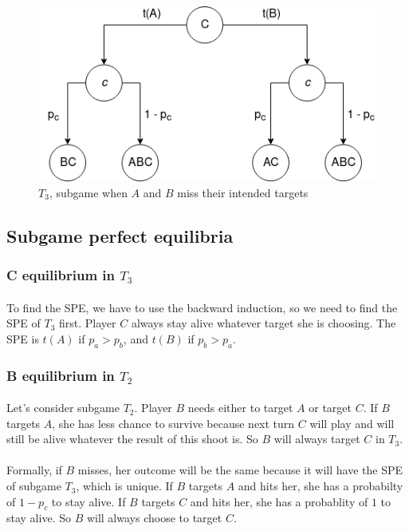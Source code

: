 \documentclass[letterpaper]{article}
\begin{document}
\begin{figure}[!ht]
 \centerline{\includegraphics[scale=0.5]{images/T3}}
 \caption{$T_3$, subgame when $A$ and $B$ miss their intended targets}
 \label{fig:t3}
\end{figure}

\subsection{Subgame perfect equilibria}

\subsubsection{C equilibrium in $T_3$}
\paragraph{}

To find the SPE, we have to use the backward induction, so we need to find
the SPE of $T_3$ first. Player $C$ always stay alive whatever target she is
choosing. The SPE is $t(A)$ if $p_a > p_b$, and $t(B)$ if $p_b > p_a$.

\subsubsection{B equilibrium in $T_2$}

\paragraph{}

Let's consider subgame $T_2$. Player $B$ needs either to target $A$
or target $C$. If $B$ targets $A$, she has less chance to survive because
next turn $C$ will play and will still be alive whatever the result
of this shoot is. So $B$ will always target $C$ in $T_3$.

\paragraph{}
Formally, if $B$ misses, her outcome will be the same because it will have
the SPE of subgame $T_3$, which is unique.
If $B$ targets $A$ and hits her, she has
a probabilty of $1 - p_c$ to stay alive. If $B$ targets $C$ and hits her, she
has a probablity of $1$ to stay alive. So $B$ will always choose to target $C$.
\end{document}
